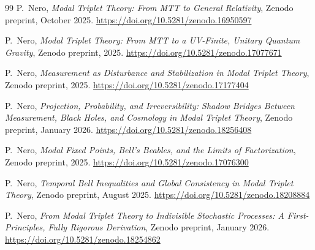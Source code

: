 \documentclass[11pt]{article}
\begin{document}
\begin{thebibliography}{99}
P.~Nero,
\emph{Modal Triplet Theory: From MTT to General Relativity},
Zenodo preprint, October 2025.
\url{https://doi.org/10.5281/zenodo.16950597}

P.~Nero,
\emph{Modal Triplet Theory: From MTT to a UV-Finite, Unitary Quantum Gravity},
Zenodo preprint, 2025.
\url{https://doi.org/10.5281/zenodo.17077671}

P.~Nero,
\emph{Measurement as Disturbance and Stabilization in Modal Triplet Theory},
Zenodo preprint, 2025.
\url{https://doi.org/10.5281/zenodo.17177404}

P.~Nero,
\emph{Projection, Probability, and Irreversibility: Shadow Bridges Between Measurement, Black Holes, and Cosmology in Modal Triplet Theory},
Zenodo preprint, January 2026.
\url{https://doi.org/10.5281/zenodo.18256408}

P.~Nero,
\emph{Modal Fixed Points, Bell’s Beables, and the Limits of Factorization},
Zenodo preprint, 2025.
\url{https://doi.org/10.5281/zenodo.17076300}

P.~Nero,
\emph{Temporal Bell Inequalities and Global Consistency in Modal Triplet Theory},
Zenodo preprint, August 2025.
\url{https://doi.org/10.5281/zenodo.18208884}

P.~Nero,
\emph{From Modal Triplet Theory to Indivisible Stochastic Processes: A First-Principles, Fully Rigorous Derivation},
Zenodo preprint, January 2026.
\url{https://doi.org/10.5281/zenodo.18254862}

\end{thebibliography}
\end{document}
